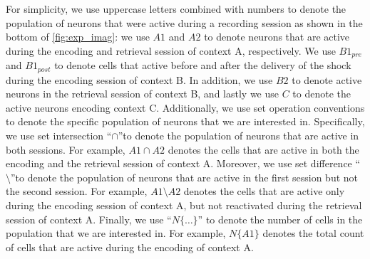 \documentclass[master.tex]{subfiles}
\begin{document}
For simplicity, we use uppercase letters combined with numbers to denote the
population of neurons that were active during a recording session as shown in
the bottom of \autoref{fig:exp_imag}: we use $A1$ and $A2$ to denote neurons
that are active during the encoding and retrieval session of context A,
respectively. We use $B1_{pre}$ and $B1_{post}$ to denote cells that active
before and after the delivery of the shock during the encoding session of
context B. In addition, we use $B2$ to denote active neurons in the retrieval
session of context B, and lastly we use $C$ to denote the active neurons
encoding context C. Additionally, we use set operation conventions to denote the
specific population of neurons that we are interested in. Specifically, we use
set intersection ``$\cap$''to denote the population of neurons that are active
in both sessions. For example, $A1 \cap A2$ denotes the cells that are active in
both the encoding and the retrieval session of context A. Moreover, we use set
difference ``$\setminus$''to denote the population of neurons that are active in
the first session but not the second session. For example, $A1 \setminus A2$
denotes the cells that are active only during the encoding session of context A,
but not reactivated during the retrieval session of context A. Finally, we use
``$N\{\ldots\}$'' to denote the number of cells in the population that we are
interested in. For example, $N\{A1\}$ denotes the total count of cells that are
active during the encoding of context A.
\end{document}
